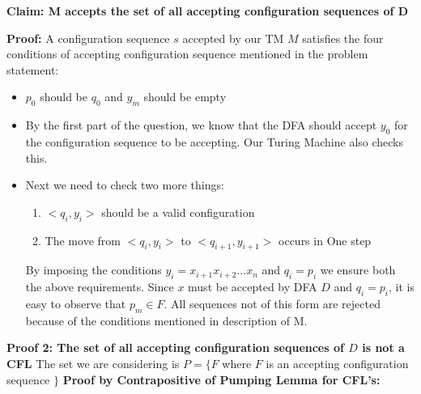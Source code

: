 \documentclass[12pt,a4paper]{article}
\begin{document}
\textbf{Claim: M accepts the set of all accepting configuration sequences of D}

\textbf{Proof:} A configuration sequence $s$ accepted by our TM $M$ satisfies the four conditions of accepting configuration sequence mentioned in the problem statement:
\begin{itemize}
\item $p_0$ should be $q_0$ and $y_m$ should be empty
\item By the first part of the question, we know that the DFA should accept $y_0$ for the configuration sequence to be accepting. Our Turing Machine also checks this.
\item Next we need to check two more things:

\begin{enumerate}
    \item $<q_i,y_i>$ should be a valid configuration
    \item The move from $<q_i,y_i>$ to $<q_{i+1},y_{i+1}>$ occurs in One step
\end{enumerate}

By imposing the conditions $y_i=x_{i+1}x_{i+2}...x_n$ and $q_i = p_i$ we ensure both the above requirements. Since $x$ must be accepted by DFA $D$ and $q_i=p_i$, it is easy to observe that $p_m \in F$. All sequences not of this form are rejected because of the conditions mentioned in description of M.
\end{itemize}

\textbf{Proof 2: The set of all accepting configuration sequences of $D$ is not a CFL}
The set we are considering is 
$P=\{{F}$ where $F$ is an accepting configuration sequence $\}$
\textbf{Proof by Contrapositive of Pumping Lemma for CFL's:}
\end{document}
